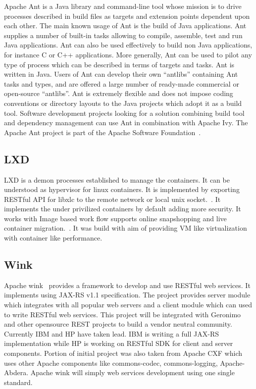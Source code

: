 Apache Ant is a Java library and command-line tool whose mission is to
drive processes described in build files as targets and extension
points dependent upon each other. The main known usage of Ant is the
build of Java applications. Ant supplies a number of built-in tasks
allowing to compile, assemble, test and run Java applications. Ant can
also be used effectively to build non Java applications, for instance
C or C++ applications. More generally, Ant can be used to pilot any
type of process which can be described in terms of targets and
tasks. Ant is written in Java. Users of Ant can develop their own
``antlibs'' containing Ant tasks and types, and are offered a large
number of ready-made commercial or open-source ``antlibs''. Ant is
extremely flexible and does not impose coding conventions or directory
layouts to the Java projects which adopt it as a build tool. Software
development projects looking for a solution combining build tool and
dependency management can use Ant in combination with Apache Ivy. The
Apache Ant project is part of the Apache Software
Foundation~\cite{ant-www}.

\subsection{LXD \cv}

LXD is a demon processes established to manage the containers. It can
be understood as hypervisor for linux containers. It is implemented by
exporting RESTful API for libxlc to the remote network or local unix
socket.~\cite{www-lxd-thevarguy}. It implements the under privilized
containers by default adding more security. It works with Image based
work flow supports online snapshopping and live container
migration.~\cite{www-lxd-lists-linux}. It was build with aim of
providing VM like virtualization with container like
performance.~\cite{www-lxd-ubuntu}

\subsection{Wink \cv}

Apache wink~\cite{www-apache-wink} provides a framework to develop and
use RESTful web services. It implements using JAX-RS v1.1
specification. The project provides server module which integrates
with all popular web servers and a client module which can used to
write RESTful web services. This project will be integrated with
Geronimo and other opensource REST projects to build a vendor neutral
community. Currently IBM and HP have taken lead. IBM is writing a full
JAX-RS implementation while HP is working on RESTful SDK for client
and server components.  Portion of initial project was also taken from
Apache CXF which uses other Apache components like commons-codec,
commons-logging, Apache-Abdera. Apache wink will simply web services
development using one single standard.

